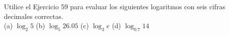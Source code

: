 \item Utilice el Ejercicio 59 para evaluar los siguientes logaritmos con seis cifras decimales correctas.\\
(a) $\log_2 5$ \qquad (b) $\log_5 26.05$ \qquad (c) $\log_3 e$ \qquad (d) $\log_{0.7} 14$
